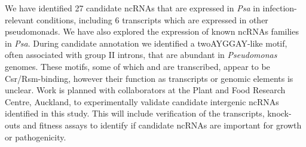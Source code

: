 We have identified 27 candidate ncRNAs that are expressed in \textit{Psa} in infection-relevant conditions, including 6 transcripts which are expressed in other pseudomonads. We have also explored the expression of known ncRNAs families in \textit{Psa}. During candidate annotation we identified a twoAYGGAY-like motif, often associated with group II introns, that are abundant in \textit{Pseudomonas} genomes. These motifs, some of which and are transcribed, appear to be Csr/Rsm-binding, however their function as transcripts or genomic elements is unclear. Work is planned with collaborators at the Plant and Food Research Centre, Auckland, to experimentally validate candidate intergenic ncRNAs identified in this study. This will include verification of the transcripts, knock-outs and fitness assays to identify if candidate ncRNAs are important for growth or pathogenicity.


